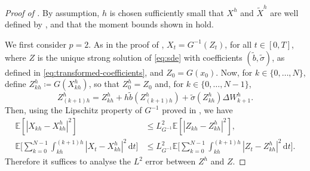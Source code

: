 \documentclass[onseside, final]{amsart}
\theoremstyle{definition}
\newcommand{\E}{\mathbb E}
\newcommand{\D}{\,\mathrm{d}}
\numberwithin{equation}{section}
\begin{document}
		\begin{proof}[Proof of ]
		By assumption, $h$ is chosen sufficiently small that $X^h$ and $\tilde X^h$ are well defined by , and that the moment bounds shown in  hold.
		
		We first consider $p = 2$. 
		As in the proof of , $X_t = G^{-1}(Z_t)$, for all $t \in [0, T]$, where $Z$ is the unique strong solution of \eqref{eq:sde} with coefficients $(\tilde b, \tilde \sigma)$, as defined in \eqref{eq:transformed-coefficients}, and $Z_0 = G(x_0)$. Now, for $k \in \{0, \dotsc, N\}$, define $Z^h_{kh} \coloneqq G(X^h_{kh})$, so that  $Z^h_0 = Z_0$ and, for $k \in \{0, \dotsc, N - 1\}$,
			\begin{equation}\label{eq:semi-implicit-z}
				Z^h_{(k + 1)h} = Z^h_{kh} + h \tilde b(Z^h_{(k + 1)h}) + \tilde \sigma(Z^h_{kh}) \Delta W^h_{k + 1}.
			\end{equation}
			Then, using the Lipschitz property of $G^{-1}$ proved in , we have
			\begin{equation}\label{eq:lipschitz-estimate}
				\begin{split}
					\E [|X_{kh} - X^h_{kh}|^2] & \leq L_{G^{-1}}^2 \E[|Z_{kh} - Z^h_{kh}|^2],\\
					\E\Biggl[\sum_{k = 0}^{N - 1} \int_{kh}^{(k+1)h}|X_t - X^h_{kh}|^2\D t\Biggr] & \leq L_{G^{-1}}^2\E\Biggl[\sum_{k = 0}^{N - 1} \int_{kh}^{(k+1)h}|Z_t - Z^h_{kh}|^2\D t\Biggr].
				\end{split}
			\end{equation}
			Therefore it suffices to analyse the $L^2$ error between $Z^h$ and $Z$.
			

\end{proof}
\end{document}
